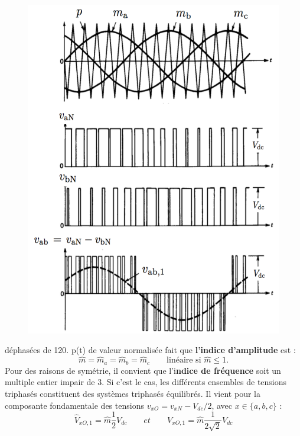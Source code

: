 		\begin{figure}
		\vspace{-5mm}
		\includegraphics[scale=0.25]{ch4/23}
		\end{figure}
		déphasées de 120\degres . p(t) de valeur normalisée fait que \textbf{l'indice d'amplitude} est :
		\begin{equation}
			\hat{m} = \hat{m}_a = \hat{m}_b = \hat{m}_c \qquad \mbox{linéaire si } \hat{m} \leq 1.
		\end{equation}
		Pour des raisons de symétrie, il convient que l'i\textbf{ndice de fréquence} soit un multiple entier impair de 3. Si c'est le cas, les différents ensembles de tensions triphasés constituent des systèmes triphasés équilibrés. Il vient pour la composante fondamentale des tensions $v_{xO} = v_{xN}-V_{dc}/2$, avec $x \in \{a, b, c\}$ : 
		\begin{equation}
			\hat{V}_{xO,1} = \hat{m}\frac{1}{2}V_{dc}\qquad et \qquad V_{xO,1} = \hat{m}\frac{1}{2\sqrt{2}}V_{dc}
		\end{equation}
		

